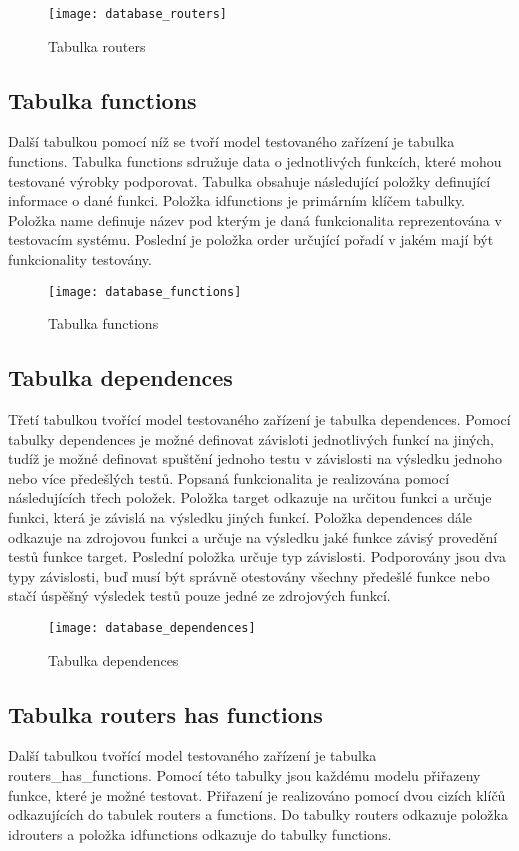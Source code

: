 \begin{figure}[h]
  \centering
  \texttt{[image: database\_routers]}
  \caption{Tabulka routers}
  \label{fig:database_routers}
\end{figure}

\subsection{Tabulka functions}
Další tabulkou pomocí níž se tvoří model testovaného zařízení je tabulka functions. Tabulka functions sdružuje data o jednotlivých funkcích, které mohou testované výrobky podporovat. Tabulka obsahuje následující položky definující informace o dané funkci. Položka idfunctions je primárním klíčem tabulky. Položka name definuje název pod kterým je daná funkcionalita reprezentována v testovacím systému. Poslední je položka order určující pořadí v jakém mají být funkcionality testovány.

\begin{figure}[h]
  \centering
  \texttt{[image: database\_functions]}
  \caption{Tabulka functions}
  \label{fig:database_functions}
\end{figure}

\subsection{Tabulka dependences}
Třetí tabulkou tvořící model testovaného zařízení je tabulka dependences. Pomocí tabulky dependences je možné definovat závisloti jednotlivých funkcí na jiných, tudíž je možné definovat spuštění jednoho testu v závislosti na výsledku jednoho nebo více předešlých testů. Popsaná funkcionalita je realizována pomocí následujících třech položek. Položka target odkazuje na určitou funkci a určuje funkci, která je závislá na výsledku jiných funkcí. Položka dependences dále odkazuje na zdrojovou funkci a určuje na výsledku jaké funkce závisý provedění testů funkce target. Poslední položka určuje typ závislosti. Podporovány jsou dva typy závislosti, buď musí být správně otestovány všechny předešlé funkce nebo stačí úspěšný výsledek testů pouze jedné ze zdrojových funkcí.

\begin{figure}[h]
  \centering
  \texttt{[image: database\_dependences]}
  \caption{Tabulka dependences}
  \label{fig:database_dependences}
\end{figure}

\subsection{Tabulka routers has functions}
Další tabulkou tvořící model testovaného zařízení je tabulka routers\_has\_functions. Pomocí této tabulky jsou každému modelu přiřazeny funkce, které je možné testovat. Přiřazení je realizováno pomocí dvou cizích klíčů odkazujících do tabulek routers a functions. Do tabulky routers odkazuje položka idrouters a položka idfunctions odkazuje do tabulky functions.

